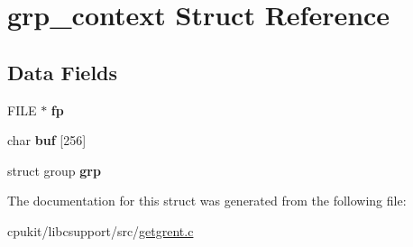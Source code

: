 \hypertarget{structgrp__context}{}\section{grp\+\_\+context Struct Reference}
\label{structgrp__context}
\subsection*{Data Fields}
\begin{DoxyCompactItemize}
\item 
\mbox{\label{structgrp__context_a68878c0a122da2e221afe30c4eda77cf}} 
F\+I\+LE $\ast$ {\bfseries fp}
\item 
\mbox{\label{structgrp__context_a7930612d75648b5ba9d3f14917522671}} 
char {\bfseries buf} \mbox{[}256\mbox{]}
\item 
\mbox{\label{structgrp__context_afa12c06dcca675717c6b376dff426fcc}} 
struct group {\bfseries grp}
\end{DoxyCompactItemize}


The documentation for this struct was generated from the following file\+:\begin{DoxyCompactItemize}
\item 
cpukit/libcsupport/src/\mbox{\hyperlink{getgrent_8c}{getgrent.\+c}}\end{DoxyCompactItemize}
